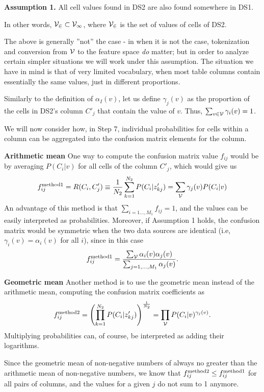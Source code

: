 \documentclass[12pt]{article}
\begin{document}
{\bf Assumption 1.} All cell values found in DS2 are also found somewhere in DS1. 

In other words, $\cal{V}_2 \subset \cal{V}_1$, where $\cal{V}_2$ is
the set of values of cells of DS2.

The above is generally ''not'' the case - in when it is not the case,
tokenization and conversion from $\cal{V}$ to the feature space {\em
  do} matter; but in order to analyze certain simpler situations we
will work under this assumption. The situation we have in mind is that
of very limited vocabulary, when most table columns contain
essentially the same values, just in different proportions.

Similarly to the definition of $\alpha_I(v)$, let us define
$\gamma_j(v)$ as the proportion of the cells in DS2's column $C'_j$
that contain the value of $v$. Thus,  $\sum_{v\in \cal{V}} \gamma_i(v)=1$.

We will now consider how, in Step 7, individual probabilities for
cells within a column can be aggregated into the confusion matrix
elements for the column.

{\bf Arithmetic mean}
One way to compute the confusion matrix value $f_{ij}$ would be by averaging $P(C_i|v)$ for all cells of the column $C'_j$, which would give us
\begin{equation}
\label{eq:ag-ar}
f_{ij}^{\rm method 1} = R(C_i,C'_j) \equiv \frac{1}{N_2} \sum_{k=1}^{N_2} P(C_i|z'_{kj}) =
\sum_{\cal{V}} \gamma_j(v) P(C_i|v) 
\end{equation}
An advantage of this method is that $\sum_{i=1\ldots,M_1} f_{ij} = 1$, and the values can be easily interpreted as probabilities. Moreover, if Assumption 1 holds, the confusion matrix would be symmetric when the two data sources are identical (i.e, $\gamma_i(v)=\alpha_i(v)$ for all $i$), since in this case 
$$
f_{ij}^{\rm method 1} =\frac{\sum_{\cal{V}} \alpha_i(v)  \alpha_j(v)}{\sum_{j=1,\ldots,M_1} \alpha_j(v)}.
$$

{\bf Geometric  mean}
Another method is to use the geometric mean instead of the arithmetic
mean, computing the confusion matrix coefficients as 
\begin{equation}
\label{eq:ag-geo}
f_{ij}^{\rm method 2} = 
 \left(\prod_{k=1}^{N_2} P(C_i|z'_{kj})\right)^{ \frac{1}{N_2}}=
\prod_{\cal{V}}  P(C_i|v)^{\gamma_j(v)}.
\end{equation}
Multiplying probabilities can, of course, be interpreted as adding their logarithms.

Since the geometric mean of non-negative numbers of always no greater than the arithmetic mean of non-negative numbers, we know that $f_{ij}^{\rm method 2} \le f_{ij}^{\rm method 1}$ for all pairs of columns, and the values for a given $j$ do not sum to 1 anymore.
\end{document}

